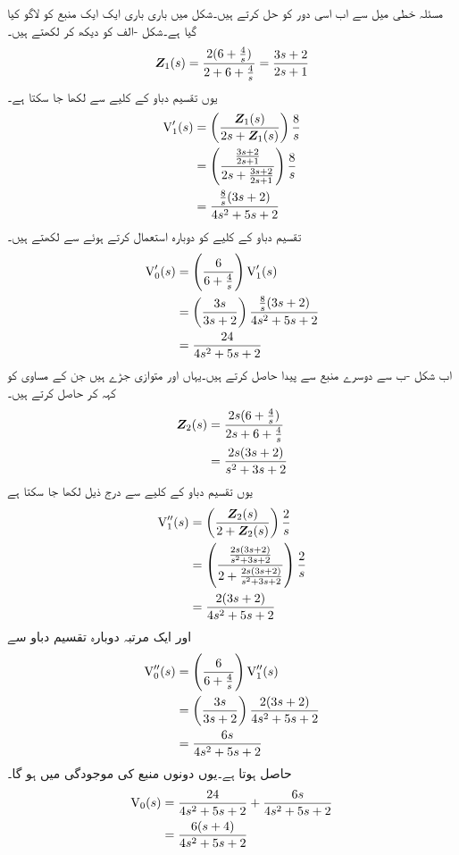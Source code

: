 مسئلہ خطی میل سے اب اسی دور کو حل کرتے ہیں۔شکل  میں باری باری ایک ایک منبع کو لاگو کیا گیا ہے۔شکل -الف کو دیکھ کر  لکھتے ہیں۔
\begin{align*}
{\ensuremath{{\boldsymbol{Z}}}}_1(s)=\frac{2(6+\frac{4}{s})}{2+6+\frac{4}{s}}=\frac{3s+2}{2s+1}
\end{align*}
یوں تقسیم دباو کے کلیے سے   لکھا جا سکتا ہے۔
\begin{align*}
{\ensuremath{{\textup{V}}}}'_1(s)&=\left(\frac{{{\boldsymbol{Z}}}_1(s)}{2s+{{\boldsymbol{Z}}}_1(s)}\right)\frac{8}{s}\\
&=\left(\frac{\frac{3s+2}{2s+1}}{2s+\frac{3s+2}{2s+1}}\right)\frac{8}{s}\\
&=\frac{\frac{8}{s}(3s+2)}{4s^2+5s+2}
\end{align*}
تقسیم دباو کے کلیے کو دوبارہ استعمال کرتے ہوئے  سے  لکھتے ہیں۔
\begin{align*}
{\ensuremath{{\textup{V}}}}'_0(s)&=\left(\frac{6}{6+\frac{4}{s}}\right){{\textup{V}}}'_1(s)\\
&=\left(\frac{3s}{3s+2}\right)\frac{\frac{8}{s}(3s+2)}{4s^2+5s+2}\\
&=\frac{24}{4s^2+5s+2}
\end{align*}
اب شکل -ب سے دوسرے منبع سے پیدا  حاصل کرتے ہیں۔یہاں  اور  متوازی جڑے ہیں جن کے مساوی کو  کہہ کر حاصل کرتے ہیں۔
\begin{align*}
{\ensuremath{{\boldsymbol{Z}}}}_2(s)&=\frac{2s(6+\frac{4}{s})}{2s+6+\frac{4}{s}}\\
&=\frac{2s(3s+2)}{s^2+3s+2}
\end{align*}
یوں تقسیم دباو کے کلیے سے درج ذیل لکھا جا سکتا ہے
\begin{align*}
{\ensuremath{{\textup{V}}}}''_1(s)&=\left(\frac{{{\boldsymbol{Z}}}_2(s)}{2+{{\boldsymbol{Z}}}_2(s)}\right)\frac{2}{s}\\
&=\left(\frac{\frac{2s(3s+2)}{s^2+3s+2}}{2+\frac{2s(3s+2)}{s^2+3s+2}}\right)\frac{2}{s}\\
&=\frac{2(3s+2)}{4s^2+5s+2}
\end{align*}
اور ایک مرتبہ دوبارہ تقسیم دباو سے 
\begin{align*}
{\ensuremath{{\textup{V}}}}''_0(s)&=\left(\frac{6}{6+\frac{4}{s}}\right){{\textup{V}}}''_1(s)\\
&=\left(\frac{3s}{3s+2}\right)\frac{2(3s+2)}{4s^2+5s+2}\\
&=\frac{6s}{4s^2+5s+2}
\end{align*}
حاصل ہوتا ہے۔یوں دونوں منبع کی موجودگی میں  ہو گا۔
\begin{align*}
{\ensuremath{{\textup{V}}}}_0(s)&=\frac{24}{4s^2+5s+2}+\frac{6s}{4s^2+5s+2}\\
&=\frac{6(s+4)}{4s^2+5s+2}
\end{align*}

